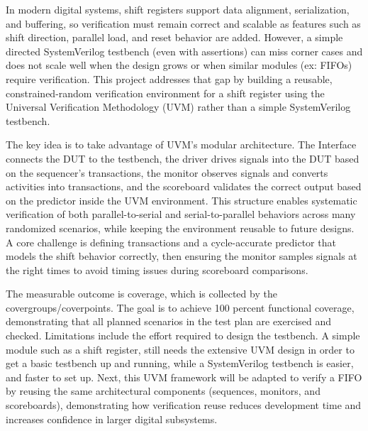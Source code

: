 In modern digital systems, shift registers support data alignment, serialization, and buffering, so verification must remain correct and scalable as features such as shift direction, parallel load, and reset behavior are added. However, a simple directed SystemVerilog testbench (even with assertions) can miss corner cases and does not scale well when the design grows or when similar modules (ex: FIFOs) require verification. This project addresses that gap by building a reusable, constrained-random verification environment for a shift register using the Universal Verification Methodology (UVM) rather than a simple SystemVerilog testbench.

The key idea is to take advantage of UVM’s modular architecture. The Interface connects the DUT to the testbench, the driver drives signals into the DUT based on the sequencer’s transactions, the monitor observes signals and converts activities into transactions, and the scoreboard validates the correct output based on the predictor inside the UVM environment. This structure enables systematic verification of both parallel-to-serial and serial-to-parallel behaviors across many randomized scenarios, while keeping the environment reusable to future designs. A core challenge is defining transactions and a cycle-accurate predictor that models the shift behavior correctly, then ensuring the monitor samples signals at the right times to avoid timing issues during scoreboard comparisons.

The measurable outcome is coverage, which is collected by the covergroups/coverpoints. The goal is to achieve 100 percent functional coverage, demonstrating that all planned scenarios in the test plan are exercised and checked. Limitations include the effort required to design the testbench. A simple module such as a shift register, still needs the extensive UVM design in order to get a basic testbench up and running, while a SystemVerilog testbench is easier, and faster to set up. Next, this UVM framework will be adapted to verify a FIFO by reusing the same architectural components (sequences, monitors, and scoreboards), demonstrating how verification reuse reduces development time and increases confidence in larger digital subsystems.
